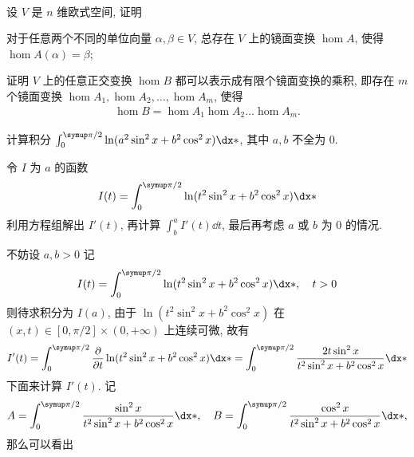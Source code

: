 \begin{exercise}[resume=exer]
\begin{align*}
      \end{align*}
      \item 设 $ V $ 是 $ n $ 维欧式空间, 证明
      \begin{exercise}
          \item 对于任意两个不同的单位向量 $ \alpha, \beta \in V $, 总存在 $ V $ 上的镜面变换 $ \hom{A} $, 使得 $ \hom{A}(\alpha) = \beta $;
          \item 证明 $ V $ 上的任意正交变换 $ \hom{B} $ 都可以表示成有限个镜面变换的乘积, 即存在 $ m $ 个镜面变换 $ \hom{A}_{1}, \hom{A}_{2}, \dots, \hom{A}_{m} $, 使得
          \begin{align*}
              \hom{B} = \hom{A}_{1}\hom{A}_{2}\dots\hom{A}_{m}.
          \end{align*}
      \end{exercise}
      \item 计算积分 $ \int_{0}^{\pi/2} \ln (a^{2}\sin^{2}x + b^{2}\cos^{2}x) \dx* $, 其中 $ a, b $ 不全为 $ 0 $.
      \begin{hint}
          令 $ I $ 为 $ a $ 的函数
          \begin{align*}
              I(t) = \int_{0}^{\pi/2} \ln (t^{2}\sin^{2}x + b^{2}\cos^{2}x) \dx*
          \end{align*}
          利用方程组解出 $ I'(t) $, 再计算 $ \int_{b}^{a} I'(t) \dd{t} $, 最后再考虑 $ a $ 或 $ b $ 为 $ 0 $ 的情况.
      \end{hint}
      \begin{answer}
          不妨设 $ a, b > 0 $ 记
          \begin{align*}
              I(t) = \int_{0}^{\pi/2} \ln (t^{2}\sin^{2}x + b^{2}\cos^{2}x) \dx*, \quad t > 0
          \end{align*}
          则待求积分为 $ I(a) $, 由于 $ \ln (t^{2}\sin^{2}x + b^{2}\cos^{2}x) $ 在 $ (x, t) \in [0, \pi/2]\times(0, +\infty) $ 上连续可微, 故有
          \begin{align*}
              I'(t) = \int_{0}^{\pi/2} \pdv{t}\ln (t^{2}\sin^{2}x + b^{2}\cos^{2}x) \dx* = \int_{0}^{\pi/2} \frac{2t\sin^{2}x}{t^{2}\sin^{2}x + b^{2}\cos^{2}x} \dx*
          \end{align*}
          下面来计算 $ I'(t) $. 记
          \begin{align*}
              A = \int_{0}^{\pi/2} \frac{\sin^{2}x}{t^{2}\sin^{2}x + b^{2}\cos^{2}x} \dx*, \quad B = \int_{0}^{\pi/2} \frac{\cos^{2}x}{t^{2}\sin^{2}x + b^{2}\cos^{2}x} \dx*,
          \end{align*}
          那么可以看出
          \begin{align}\label{eq:t2A+b2B}

\end{align}
\end{answer}
\end{exercise}
